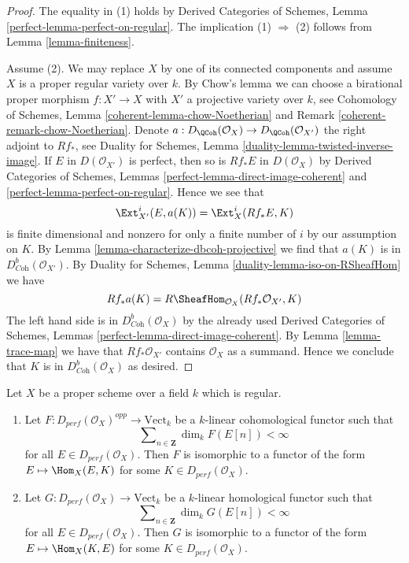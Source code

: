 \begin{proof}
The equality in (1) holds by Derived Categories of Schemes,
Lemma \ref{perfect-lemma-perfect-on-regular}.
The implication (1) $\Rightarrow$ (2) follows from
Lemma \ref{lemma-finiteness}.

\medskip\noindent
Assume (2). We may replace $X$ by one of its connected components
and assume $X$ is a proper regular variety over $k$.
By Chow's lemma we can choose a birational proper morphism
$f : X' \to X$ with $X'$ a projective variety over $k$, see
Cohomology of Schemes, Lemma \ref{coherent-lemma-chow-Noetherian}
and Remark \ref{coherent-remark-chow-Noetherian}.
Denote $a : D_\QCoh(\mathcal{O}_X) \to D_\QCoh(\mathcal{O}_{X'})$
the right adjoint to $Rf_*$, see
Duality for Schemes, Lemma \ref{duality-lemma-twisted-inverse-image}.
If $E$ in $D(\mathcal{O}_{X'})$ is perfect, then so is
$Rf_*E$ in $D(\mathcal{O}_X)$ by
Derived Categories of Schemes, Lemmas
\ref{perfect-lemma-direct-image-coherent} and
\ref{perfect-lemma-perfect-on-regular}.
Hence we see that
$$
\Ext^i_{X'}(E, a(K)) = \Ext^i_X(Rf_*E, K)
$$
is finite dimensional and nonzero for only a finite number of $i$
by our assumption on $K$. By
Lemma \ref{lemma-characterize-dbcoh-projective}
we find that $a(K)$ is in $D^b_{\textit{Coh}}(\mathcal{O}_{X'})$.
By Duality for Schemes, Lemma \ref{duality-lemma-iso-on-RSheafHom} we have
$$
Rf_*a(K) = R\SheafHom_{\mathcal{O}_X}(Rf_*\mathcal{O}_{X'}, K)
$$
The left hand side is in $D^b_{\textit{Coh}}(\mathcal{O}_X)$
by the already used Derived Categories of Schemes, Lemmas
\ref{perfect-lemma-direct-image-coherent}.
By Lemma \ref{lemma-trace-map} we have that $Rf_*\mathcal{O}_{X'}$
contains $\mathcal{O}_X$ as a summand. Hence we conclude that
$K$ is in $D^b_{\textit{Coh}}(\mathcal{O}_X)$
as desired.
\end{proof}

\begin{lemma}
\label{lemma-bondal-van-den-bergh}
Let $X$ be a proper scheme over a field $k$ which is regular.
\begin{enumerate}
\item Let $F : D_{perf}(\mathcal{O}_X)^{opp} \to \text{Vect}_k$
be a $k$-linear cohomological functor such that
$$
\sum\nolimits_{n \in \mathbf{Z}} \dim_k F(E[n]) < \infty
$$
for all $E \in D_{perf}(\mathcal{O}_X)$. Then $F$ is isomorphic to a functor
of the form $E \mapsto \Hom_X(E, K)$ for some $K \in D_{perf}(\mathcal{O}_X)$.
\item Let $G : D_{perf}(\mathcal{O}_X) \to \text{Vect}_k$
be a $k$-linear homological functor such that
$$
\sum\nolimits_{n \in \mathbf{Z}} \dim_k G(E[n]) < \infty
$$
for all $E \in D_{perf}(\mathcal{O}_X)$. Then $G$ is isomorphic to a functor
of the form $E \mapsto \Hom_X(K, E)$ for some $K \in D_{perf}(\mathcal{O}_X)$.
\end{enumerate}
\end{lemma}

